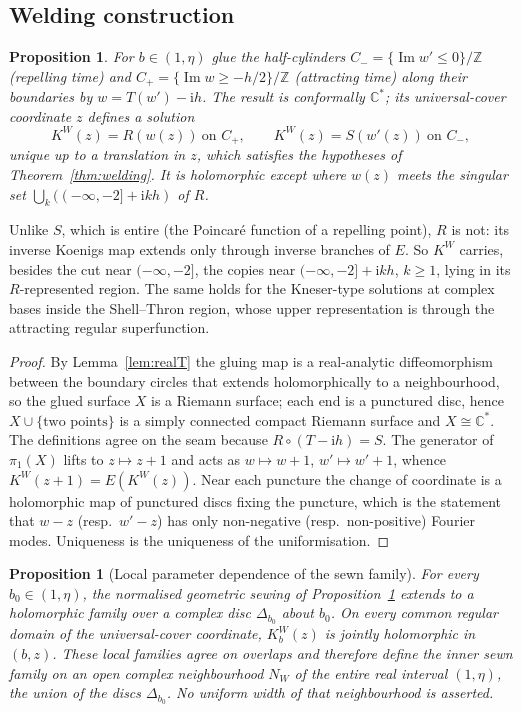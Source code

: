 \documentclass[11pt]{amsart}
\newtheorem{proposition}[theorem]{Proposition}
\theoremstyle{definition}
\newcommand{\Rr}{R}
\newcommand{\Kk}{K}
\newcommand{\ii}{\mathrm{i}}
\begin{document}
\subsection{Welding construction}

\begin{proposition}\label{prop:weld}
For $b\in(1,\eta)$ glue the half-cylinders
$C_-=\{\operatorname{Im}w'\le0\}/\mathbb Z$ (repelling time) and
$C_+=\{\operatorname{Im}w\ge-h/2\}/\mathbb Z$ (attracting time) along their
boundaries by $w=T(w')-\ii h$.  The result is conformally $\mathbb C^*$; its
universal-cover coordinate $z$ defines a solution
\[
 \Kk^{W}(z)=\Rr(w(z))\ \text{on }C_+,\qquad \Kk^{W}(z)=S(w'(z))\ \text{on }C_-,
\]
unique up to a translation in $z$, which satisfies the hypotheses of
Theorem~\ref{thm:welding}.  It is holomorphic except where $w(z)$ meets the
singular set $\bigcup_{k}((-\infty,-2]+\ii kh)$ of $\Rr$.
\end{proposition}

\noindent
Unlike $S$, which is entire (the Poincar\'e function of a repelling point),
$\Rr$ is not: its inverse Koenigs map extends only through inverse branches of
$E$.  So $\Kk^W$ carries, besides the cut near $(-\infty,-2]$, the copies
near $(-\infty,-2]+\ii kh$, $k\ge1$, lying in its $\Rr$-represented region.
The same holds for the Kneser-type solutions at complex bases inside the
Shell--Thron region, whose upper representation is through the attracting
regular superfunction.

\begin{proof}
By Lemma~\ref{lem:realT} the gluing map is a real-analytic diffeomorphism
between the boundary circles that extends holomorphically to a neighbourhood,
so the glued surface $X$ is a Riemann surface; each end is a punctured disc,
hence $X\cup\{\text{two points}\}$ is a simply connected compact Riemann
surface and $X\cong\mathbb C^*$.  The definitions agree on the seam because
$\Rr\circ(T-\ii h)=S$.  The generator of $\pi_1(X)$ lifts to $z\mapsto z+1$
and acts as $w\mapsto w+1$, $w'\mapsto w'+1$, whence
$\Kk^W(z+1)=E(\Kk^W(z))$.  Near each puncture the change of coordinate is a
holomorphic map of punctured discs fixing the puncture, which is the
statement that $w-z$ (resp.\ $w'-z$) has only non-negative (resp.\
non-positive) Fourier modes.  Uniqueness is the uniqueness of the uniformisation.
\end{proof}

\begin{proposition}[Local parameter dependence of the sewn family]
\label{prop:weld-parameter}
For every $b_0\in(1,\eta)$, the normalised geometric sewing of
Proposition~\ref{prop:weld} extends to a holomorphic family over a complex
disc $\Delta_{b_0}$ about $b_0$.  On every common regular domain of the
universal-cover coordinate, $\Kk_b^W(z)$ is jointly holomorphic in $(b,z)$.
These local families agree on overlaps and therefore define the inner sewn
family on an open complex neighbourhood $N_W$ of the entire real interval
$(1,\eta)$, the union of the discs $\Delta_{b_0}$.  No uniform width of that
neighbourhood is asserted.
\end{proposition}
\end{document}
